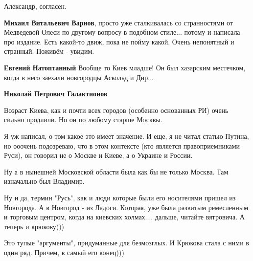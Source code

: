 \begin{itemize}
\begin{itemize}
Александр, согласен.

 

\textbf{Михаил Витальевич Варнов}, просто уже сталкивалась со странностями от
Медведевой Олеси по другому вопросу в подобном стиле... потому и написала про
издание. Есть какой-то движ, пока не пойму какой. Очень непонятный и странный.
Поживём - увидим.

 
\textbf{Евгений Натоптанный} Вообще то Киев младше! Он был хазарским местечком, когда в него заехали новгородцы Аскольд и Дир...

 
\textbf{Николай Петрович Галактионов} 

Возраст Киева, как и почти всех городов (особенно основанных РИ) очень сильно
продлили. Но он по любому старше Москвы.

Я уж написал, о том какое это имеет значение. И еще, я не читал статью Путина,
но ооочень подозреваю, что в этом контексте (кто является правоприемниками
Руси), он говорил не о Москве и Киеве, а о Украине и России.

Ну а в нынешней Московской области была как бы не только Москва. Там изначально
был Владимир.

Ну и да, термин "Русь", как и люди которые были его носителями пришел из
Новгорода. А в Новгород - из Ладоги. Которая, уже была развитым ремесленным и
торговым центром, когда на киевских холмах.... дальше, читайте вятровича. А
теперь и крюкову)))

Это тупые "аргументы", придуманные для безмозглых. И Крюкова стала с ними в
один ряд. Причем, в самый его конец)))

 

\end{itemize}
\end{itemize}

